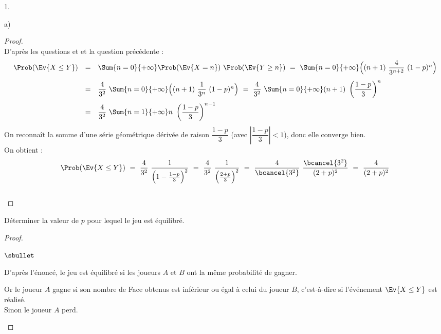 \documentclass[11pt]{article}%
\begin{document}
\begin{noliste}{1.}
\begin{noliste}{a)}
    \begin{proof}~\\
      D'après les questions  et  et la question 
      précédente :
      \[
        \begin{array}{rcl}
          \Prob(\Ev{X \leq Y}) & = &  \Sum{n=0}{+\infty}
          \Prob(\Ev{X=n}) \ \Prob(\Ev{Y \geq n})
          \ = \ \Sum{n=0}{+\infty} \Big( (n+1) \ \dfrac{4}{3^{n+2}} \
          (1-p)^n\Big)
          \\[.4cm]
          & = &  \dfrac{4}{3^2} \ \Sum{n=0}{+\infty} \Big( (n+1) \ 
          \dfrac{1}{3^n} \ (1-p)^n \Big)
          \ = \ \dfrac{4}{3^2} \ \Sum{n=0}{+\infty} (n+1) \
          \left( \dfrac{1-p}{3}\right)^n
          \\[.4cm]
          & = &  \dfrac{4}{3^2} \ \Sum{n=1}{+\infty} n \ \left(
          \dfrac{1-p}{3}\right)^{n-1} 
        \end{array}
      \]
      On reconnaît la somme d'une série géométrique dérivée de raison 
      $\dfrac{1-p}{3}$ (avec $\left\vert \dfrac{1-p}{3} \right\vert 
      <1$), donc elle converge bien.\\
      On obtient :
      \[
        \Prob(\Ev{X \leq Y}) \ = \ \dfrac{4}{3^2} \ 
        \dfrac{1}{\Big(1- \frac{1-p}{3}\Big)^2}
        \ = \ \dfrac{4}{3^2} \ \dfrac{1}{\Big(\frac{2+p}{3}\Big)^2}
        \ = \ \dfrac{4}{\bcancel{3^2}} \ 
        \dfrac{\bcancel{3^2}}{(2+p)^2} \ = \ 
        \dfrac{4}{(2+p)^2}
      \]
      ~\\[-1cm]
    \end{proof}

    
    \item Déterminer la valeur de $p$ pour lequel le jeu est équilibré.
    
    \begin{proof}~
      \begin{noliste}{$\sbullet$}
	\item D'après l'énoncé, le jeu est équilibré si les joueurs $A$
	et $B$ ont la même probabilité de gagner.
	
	\item Or le joueur $A$ gagne si son nombre de Face obtenus est 
	inférieur ou égal à celui du joueur $B$, c'est-à-dire si 
	l'événement $\Ev{X \leq Y}$ est réalisé.\\
	Sinon le joueur $A$ perd.
	
	
	

\end{noliste}
\end{proof}
\end{noliste}
\end{noliste}
\end{document}
